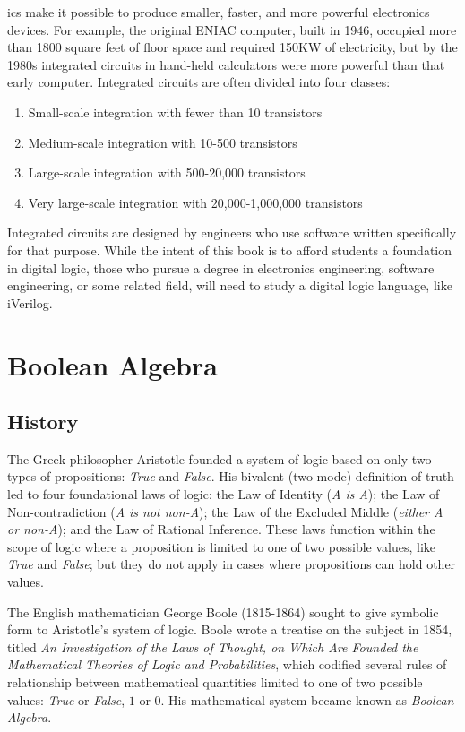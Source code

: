 \Glspl{ic} make it possible to produce smaller, faster, and more powerful electronics devices. For example, the original ENIAC computer, built in 1946, occupied more than 1800 square feet of floor space and required 150KW of electricity, but by the 1980s integrated circuits in hand-held calculators were more powerful than that early computer. Integrated circuits are often divided into four classes: 

\begin{enumerate}
  \item Small-scale integration with fewer than 10 transistors
  \item Medium-scale integration with 10-500 transistors
  \item Large-scale integration with 500-20,000 transistors
  \item Very large-scale integration with 20,000-1,000,000 transistors
\end{enumerate}

Integrated circuits are designed by engineers who use software written specifically for that purpose. While the intent of this book is to afford students a foundation in digital logic, those who pursue a degree in electronics engineering, software engineering, or some related field, will need to study a digital logic language, like iVerilog.

\section{Boolean Algebra}

\subsection{History}

The Greek philosopher Aristotle founded a system of logic based on only two types of propositions: \emph{True} and \emph{False}. His bivalent (two-mode) definition of truth led to four foundational laws of logic: the Law of Identity (\emph{A is A}); the Law of Non-contradiction (\emph{A is not non-A}); the Law of the Excluded Middle (\emph{either A or non-A}); and the Law of Rational Inference. These laws function within the scope of logic where a proposition is limited to one of two possible values, like \emph{True} and \emph{False}; but they do not apply in cases where propositions can hold other values.

The English mathematician George Boole (1815-1864) sought to give symbolic form to Aristotle's system of logic. Boole wrote a treatise on the subject in 1854, titled \emph{An Investigation of the Laws of Thought, on Which Are Founded the Mathematical Theories of Logic and Probabilities}, which codified several rules of relationship between mathematical quantities limited to one of two possible values: \emph{True} or \emph{False}, $ 1 $ or $ 0 $. His mathematical system became known as \emph{Boolean Algebra}.

